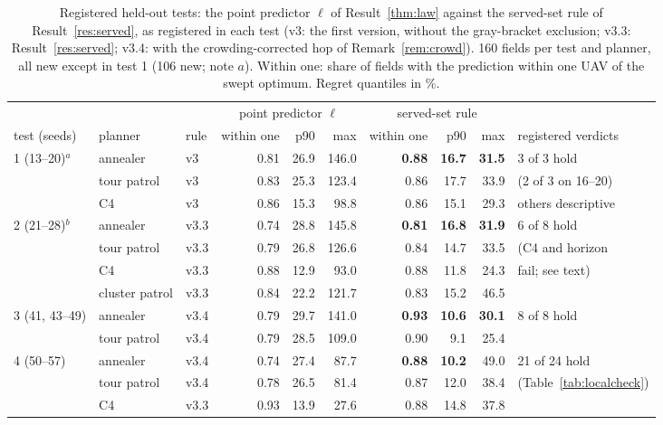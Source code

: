 \documentclass[journal,outdir=./]{IEEEtran}
\begin{document}
\begin{table}[t]\centering
\footnotesize\setlength{\tabcolsep}{4pt}
\caption{Registered held-out tests: the point predictor $\ell$ of Result~\ref{thm:law} against the served-set rule of Result~\ref{res:served}, as registered in each test (v3: the first version, without the gray-bracket exclusion; v3.3: Result~\ref{res:served}; v3.4: with the crowding-corrected hop of Remark~\ref{rem:crowd}). 160 fields per test and planner, all new except in test 1 (106 new; note $a$). Within one: share of fields with the prediction within one UAV of the swept optimum. Regret quantiles in \%.}
\label{tab:heldout}
\begin{tabular}{lll rrr rrr l}
\toprule
& & & \multicolumn{3}{c}{point predictor $\ell$} & \multicolumn{3}{c}{served-set rule} & \\
\cmidrule(lr){4-6}\cmidrule(lr){7-9}
test (seeds) & planner & rule & within one & p90 & max & within one & p90 & max & registered verdicts\\
\midrule
1 (13--20)$^{a}$ & annealer & v3 & 0.81 & 26.9 & 146.0 & \textbf{0.88} & \textbf{16.7} & \textbf{31.5} & 3 of 3 hold\\
 & tour patrol & v3 & 0.83 & 25.3 & 123.4 & 0.86 & 17.7 & 33.9 & (2 of 3 on 16--20)\\
 & C4 & v3 & 0.86 & 15.3 & 98.8 & 0.86 & 15.1 & 29.3 & others descriptive\\
\midrule
2 (21--28)$^{b}$ & annealer & v3.3 & 0.74 & 28.8 & 145.8 & \textbf{0.81} & \textbf{16.8} & \textbf{31.9} & 6 of 8 hold\\
 & tour patrol & v3.3 & 0.79 & 26.8 & 126.6 & 0.84 & 14.7 & 33.5 & (C4 and horizon\\
 & C4 & v3.3 & 0.88 & 12.9 & 93.0 & 0.88 & 11.8 & 24.3 & fail; see text)\\
 & cluster patrol & v3.3 & 0.84 & 22.2 & 121.7 & 0.83 & 15.2 & 46.5 & \\
\midrule
3 (41, 43--49) & annealer & v3.4 & 0.79 & 29.7 & 141.0 & \textbf{0.93} & \textbf{10.6} & \textbf{30.1} & 8 of 8 hold\\
 & tour patrol & v3.4 & 0.79 & 28.5 & 109.0 & 0.90 & 9.1 & 25.4 & \\
\midrule
4 (50--57) & annealer & v3.4 & 0.74 & 27.4 & 87.7 & \textbf{0.88} & \textbf{10.2} & 49.0 & 21 of 24 hold\\
 & tour patrol & v3.4 & 0.78 & 26.5 & 81.4 & 0.87 & 12.0 & 38.4 & (Table~\ref{tab:localcheck})\\
 & C4 & v3.3 & 0.93 & 13.9 & 27.6 & 0.88 & 14.8 & 37.8 & \\

\end{tabular}
\end{table}
\end{document}
